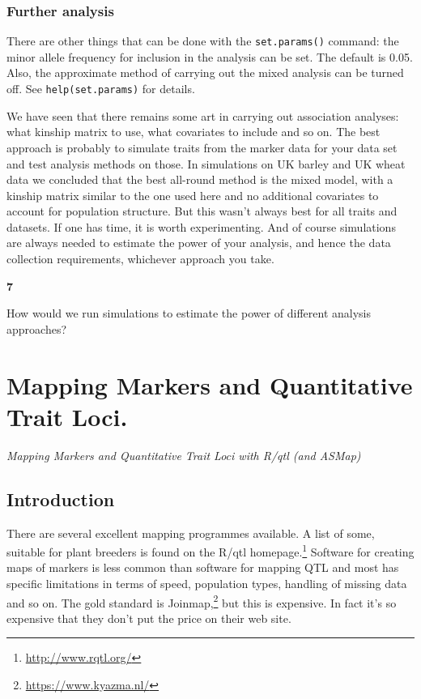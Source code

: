 \documentclass[
]{book}
\makeatletter
\renewcommand{\href}[2]{#2\footnote{\url{#1}}}
\newenvironment{kframe}{%
\medskip{}
\setlength{\fboxsep}{.8em}
 \def\at@end@of@kframe{}%
 \ifinner\ifhmode%
  \def\at@end@of@kframe{\end{minipage}}%
  \begin{minipage}{\columnwidth}%
 \fi\fi%
 \def\FrameCommand##1{\hskip\@totalleftmargin \hskip-\fboxsep
 \colorbox{shadecolor}{##1}\hskip-\fboxsep
     \hskip-\linewidth \hskip-\@totalleftmargin \hskip\columnwidth}%
 \MakeFramed {\advance\hsize-\width
   \@totalleftmargin\z@ \linewidth\hsize
   \@setminipage}}%
 {\par\unskip\endMakeFramed%
 \at@end@of@kframe}
\newenvironment{rmdblock}[1]
  {
  \begin{itemize}
  \renewcommand{\labelitemi}{
    \raisebox{-.7\height}[0pt][0pt]{
      {\setkeys{Gin}{width=3em,keepaspectratio}\texttt{[image: images/\#1]}}
    }
  }
  \setlength{\fboxsep}{1em}
  \begin{kframe}
  \item
  }
  {
  \end{kframe}
  \end{itemize}
  }
\newenvironment{rmdquiz}
  {\begin{rmdblock}{quiz}}
  {\end{rmdblock}}
\makeatother
\begin{document}
\hypertarget{further-analysis}{%
\subsection{Further analysis}\label{further-analysis}}

There are other things that can be done with the \texttt{set.params()} command: the minor allele frequency for inclusion in the analysis can be set. The default is 0.05. Also, the approximate method of carrying out the mixed analysis can be turned off. See \texttt{help(set.params)} for details.

We have seen that there remains some art in carrying out association analyses: what kinship matrix to use, what covariates to include and so on. The best approach is probably to simulate traits from the marker data for your data set and test analysis methods on those. In simulations on UK barley and UK wheat data we concluded that the best all-round method is the mixed model, with a kinship matrix similar to the one used here and no additional covariates to account for population structure. But this wasn't always best for all traits and datasets. If one has time, it is worth experimenting. And of course simulations are always needed to estimate the power of your analysis, and hence the data collection requirements, whichever approach you take.

\begin{rmdquiz}
\textbf{7}

How would we run simulations to estimate the power of different analysis approaches?
\end{rmdquiz}

\hypertarget{Mapping-Markers}{%
\chapter{Mapping Markers and Quantitative Trait Loci.}\label{Mapping-Markers}}

\emph{Mapping Markers and Quantitative Trait Loci with R/qtl (and ASMap)}

\hypertarget{introduction-2}{%
\section{Introduction}\label{introduction-2}}

There are several excellent mapping programmes available. A list of some, suitable for plant breeders is found on the R/qtl \href{http://www.rqtl.org/}{homepage.} Software for
creating maps of markers is less common than software for mapping QTL and most has
specific limitations in terms of speed, population types, handling of missing data and so
on. The gold standard is \href{https://www.kyazma.nl/}{Joinmap,} but this is expensive. In fact
it's so expensive that they don't put the price on their web site.
\end{document}
